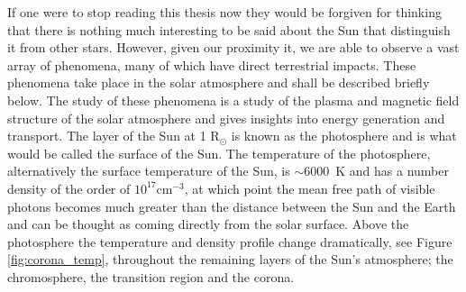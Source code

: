 If one were to stop reading this thesis now they would be forgiven for thinking that there is nothing much interesting to be said about the Sun that distinguish it from other stars. However, given our proximity it, we are able to observe a vast array of phenomena, many of which have direct terrestrial impacts. These phenomena take place in the solar atmosphere and shall be described briefly below. The study of these phenomena is a study of the plasma and magnetic field structure of the solar atmosphere and gives insights into energy generation and transport.
The layer of the Sun at 1 R$_{\odot}$ is known as the photosphere and is what would be called the surface of the Sun. The temperature of the photosphere, alternatively the surface temperature of the Sun, is $\sim 6000$~K and has a number density of the order of $10^{17} \mbox{cm}^{-3}$, at which point the mean free path of visible photons becomes much greater than the distance between the Sun and the Earth and can be thought as coming directly from the solar surface.
Above the photosphere the temperature and density profile change dramatically, see Figure \ref{fig:corona_temp}, throughout the remaining layers of the Sun's atmosphere; the chromosphere, the transition region and the corona. 
